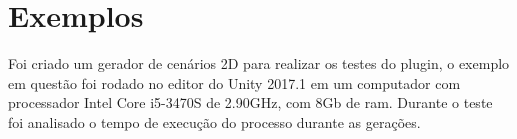 \section{Exemplos}
Foi criado um gerador de cenários 2D para realizar os testes do plugin, o exemplo em questão foi rodado no editor do Unity 2017.1 em um computador com processador Intel Core i5-3470S de 2.90GHz, com 8Gb de ram. Durante o teste foi analisado o tempo de execução do processo durante as gerações.
